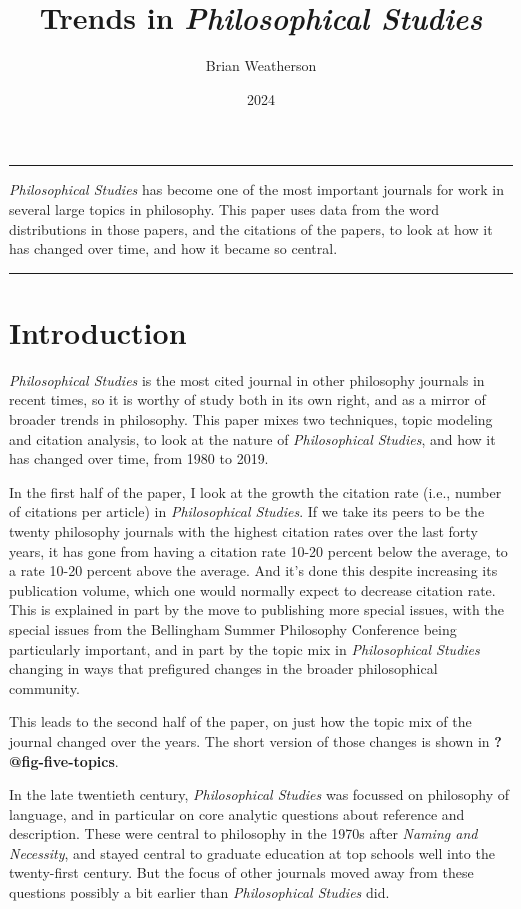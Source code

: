 \documentclass[
  10pt,
  letterpaper,
  DIV=11,
  numbers=noendperiod,
  twoside]{scrartcl}
\title{Trends in \emph{Philosophical Studies}}
\author{Brian Weatherson}
\date{2024}
\renewenvironment{abstract}
 {\vspace{-1.25cm}
 \quotation\small\noindent\rule{\linewidth}{.5pt}\par\smallskip
 \noindent }
 {\par\noindent\rule{\linewidth}{.5pt}\endquotation}
\begin{document}
\maketitle
\begin{abstract}
\emph{Philosophical Studies} has become one of the most important
journals for work in several large topics in philosophy. This paper uses
data from the word distributions in those papers, and the citations of
the papers, to look at how it has changed over time, and how it became
so central.
\end{abstract}


\section{Introduction}\label{sec-introduction}

\emph{Philosophical Studies} is the most cited journal in other
philosophy journals in recent times, so it is worthy of study both in
its own right, and as a mirror of broader trends in philosophy. This
paper mixes two techniques, topic modeling and citation analysis, to
look at the nature of \emph{Philosophical Studies}, and how it has
changed over time, from 1980 to 2019.

In the first half of the paper, I look at the growth the citation rate
(i.e., number of citations per article) in \emph{Philosophical Studies}.
If we take its peers to be the twenty philosophy journals with the
highest citation rates over the last forty years, it has gone from
having a citation rate 10-20 percent below the average, to a rate 10-20
percent above the average. And it's done this despite increasing its
publication volume, which one would normally expect to decrease citation
rate. This is explained in part by the move to publishing more special
issues, with the special issues from the Bellingham Summer Philosophy
Conference being particularly important, and in part by the topic mix in
\emph{Philosophical Studies} changing in ways that prefigured changes in
the broader philosophical community.

This leads to the second half of the paper, on just how the topic mix of
the journal changed over the years. The short version of those changes
is shown in \textbf{?@fig-five-topics}.

In the late twentieth century, \emph{Philosophical Studies} was focussed
on philosophy of language, and in particular on core analytic questions
about reference and description. These were central to philosophy in the
1970s after \emph{Naming and Necessity}, and stayed central to graduate
education at top schools well into the twenty-first century. But the
focus of other journals moved away from these questions possibly a bit
earlier than \emph{Philosophical Studies} did.
\end{document}
